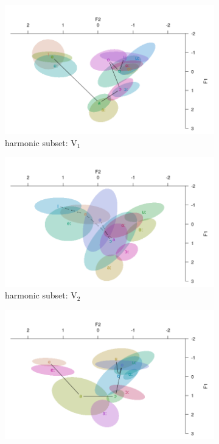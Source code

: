 \documentclass[a4paper,11pt,twocolumn]{article}
\begin{document}
	\begin{center}
		\begin{figure}[!ht]
			\begin{subfigure}[t]{0.2\textwidth}
				\centering
				\includegraphics[scale=0.2]{har_v1.png} 
				\caption{harmonic subset: V$_1$} \label{har_v1}
			\end{subfigure}
			\begin{subfigure}[t]{0.2\textwidth}
				\centering
				\includegraphics[scale=0.2]{har_v2.png} 
				\caption{harmonic subset: V$_2$} \label{har_v2}
			\end{subfigure}	
			\begin{subfigure}[t]{0.2\textwidth}
				\centering
				\includegraphics[scale=0.2]{nh_v1.png} 

\end{subfigure}
\end{figure}
\end{center}
\end{document}
